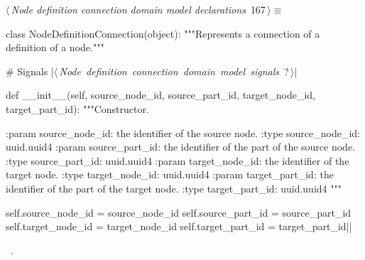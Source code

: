 \documentclass[%
    a4paper,    %
    justified,  %
    nobib,      %
    openany     %
]{tufte-book}
\begin{document}
\begin{flushleft} \small
\begin{minipage}{\linewidth}\label{scrap196}\raggedright\small
{} $\langle\,${\itshape Node definition connection domain model declarations}\nobreak\ {\footnotesize {167}}$\,\rangle\equiv$
\vspace{-1ex}
\begin{pythoncode}
class NodeDefinitionConnection(object):
    """Represents a connection of a definition of a node."""

    # Signals
    |\hbox{$\langle\,${\itshape Node definition connection domain model signals}\nobreak\ {\footnotesize ?}$\,\rangle$}|

    def __init__(self,
                 source_node_id, source_part_id,
                 target_node_id, target_part_id):
        """Constructor.

        :param source_node_id: the identifier of the source node.
        :type  source_node_id: uuid.uuid4
        :param source_part_id: the identifier of the part of the source node.
        :type  source_part_id: uuid.uuid4
        :param target_node_id: the identifier of the target node.
        :type  target_node_id: uuid.uuid4
        :param target_part_id: the identifier of the part of the target node.
        :type  target_part_id: uuid.uuid4
        """

        self.source_node_id = source_node_id
        self.source_part_id = source_part_id
        self.target_node_id = target_node_id
        self.target_part_id = target_part_id|\NWsep|
\end{pythoncode}
\vspace{1.5ex}
\footnotesize
\begin{list}{}{\setlength{\itemsep}{-\parsep}\setlength{\itemindent}{-\leftmargin}}
\item \NWtxtMacroRefIn\ .

\item{}
\end{list}
\end{minipage}\vspace{4ex}
\end{flushleft}
\end{document}
